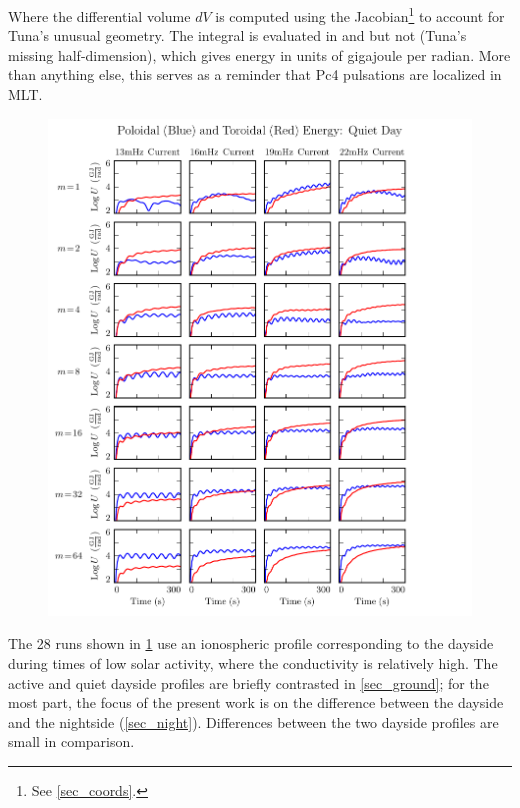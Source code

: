 Where the differential volume $dV$ is computed using the Jacobian\footnote{See \cref{sec_coords}. } to account for Tuna's unusual geometry. The integral is evaluated in \lysakx and \lysakz but not \lysaky (Tuna's missing half-dimension), which gives energy in units of gigajoule per radian. More than anything else, this serves as a reminder that Pc4 pulsations are localized in MLT. 

\begin{figure}[!htb]
    \centering
    \includegraphics[width=\textwidth]{figures/U_day.pdf}
    \caption[Dayside Poloidal and Toroidal Energy]{
    }
    \label{fig_U_day}
\end{figure}

The 28 runs shown in \cref{fig_U_day} use an ionospheric profile corresponding to the dayside during times of low solar activity, where the conductivity is relatively high. The active and quiet dayside profiles are briefly contrasted in \cref{sec_ground}; for the most part, the focus of the present work is on the difference between the dayside and the nightside (\cref{sec_night}). Differences between the two dayside profiles are small in comparison. 

